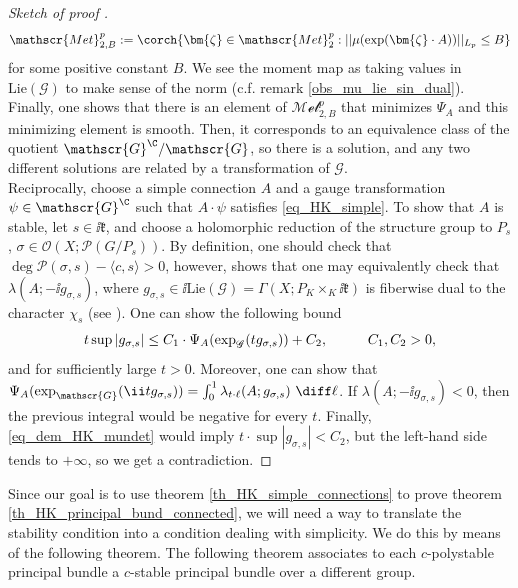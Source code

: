 {\begin{proof}[\textit{Sketch of proof} \parencite{i1999hitchin}]
    \[
    \mathscr{Met}^p_{2,B}:=\corch{\bm{\zeta}\in \mathscr{Met}^p_2:||\mu(\exp(\bm{\zeta}\cdot A))||_{L_p} \leq B}
    \] 
    for some positive constant \(B\). We see the moment map as taking values in \(\mathrm{Lie}(\mathscr{G})\) to make sense of the norm (c.f. remark \ref{obs_mu_lie_sin_dual}). Finally, one shows that there is an element of \(\mathscr{Met}^p_{2,B}\) that minimizes \(\Psi_A\) and this minimizing element is smooth. Then, it corresponds to an equivalence class of the quotient \(\mathscr{G}^\C/\mathscr{G}\), so there is a solution, and any two different solutions are related by a transformation of \(\mathscr{G}\). \\ 

    Reciprocally, choose a simple connection \(A\) and a gauge transformation \(\psi \in \mathscr{G}^\C\) such that \(A\cdot \psi\) satisfies \eqref{eq_HK_simple}. To show that \(A\) is stable, let \(s \in \ii \mathfrak{k}\), and choose a holomorphic reduction of the structure group to \(P_s\), \(\sigma \in \mathcal{O}(X; \mathcal{P}(G/P_s))\). By definition, one should check that \(\deg \mathcal{P}(\sigma, s)-\langle c, s\rangle >0\), however, \parencite[Lemma 4.3]{i1999hitchin} shows that one may equivalently check that \(\lambda(A;-\ii g_{\sigma,s})\), where \(g_{\sigma, s} \in \ii \mathrm{Lie}(\mathscr{G})=\Gamma(X; P_K \times_K \ii \mathfrak{k})\) is fiberwise dual to the character \(\chi_s\) (see \parencite[Sec. 2.7]{i1999hitchin}). One can show the following bound \parencite[Sec. 6.3]{i1999hitchin}
    \begin{equation} \label{eq_dem_HK_mundet}
    t \sup |g_{\sigma, s}| \leq C_1 \cdot \Psi_A(\exp_{\mathscr{G}}(t g_{\sigma,s})) + C_2, \hspace{1 cm} C_1, C_2>0,
    \end{equation}
    and for sufficiently large \(t>0\). Moreover, one can show that \(\Psi_A(\exp_{\mathscr{G}}(\ii t g_{\sigma, s}))=\int_0^1 \lambda_{t\cdot\ell} (A; g_{\sigma, s}) \ \diff \ell\). If \(\lambda(A; -\ii g_{\sigma, s})<0\), then the previous integral would be negative for every \(t\). Finally, \eqref{eq_dem_HK_mundet} would imply \(t\cdot \sup|g_{\sigma, s}|<C_2\), but the left-hand side tends to \(+\infty\), so we get a contradiction.
\end{proof}

Since our goal is to use theorem \ref{th_HK_simple_connections} to prove theorem \ref{th_HK_principal_bund_connected}, we will need a way to translate the stability condition into a condition dealing with simplicity. We do this by means of the following theorem. The following theorem associates to each \(c\)-polystable principal bundle a \(c\)-stable principal bundle over a different group.

}
